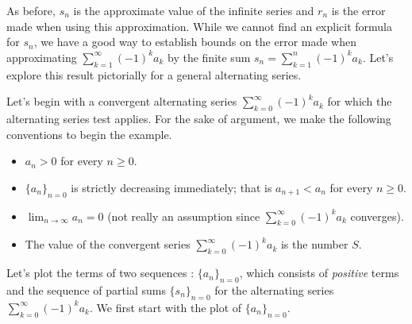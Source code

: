 \documentclass{ximera}
\begin{document}
As before, $s_n$ is the approximate value of the infinite series and $r_n$ is the error made when using this approximation.  While we cannot find an explicit formula for $s_n$, we have a good way to establish bounds on the error made when approximating $ \sum_{k=1}^{\infty} (-1)^k a_k$ by the finite sum $s_n= \sum_{k=1}^{n} (-1)^k a_k$.   Let's explore this result pictorially for a general alternating series.

\begin{model}
Let's begin with a convergent alternating series $\sum_{k=0}^{\infty} (-1)^k a_k$ for which the alternating series test applies.  For the sake of argument, we make the following conventions to begin the example.

\begin{itemize}
\item $a_n > 0$ for every $n \geq 0$. 
\item $\{a_n\}_{n=0}$ is strictly decreasing immediately; that is $a_{n+1} < a_n$ for every $n \geq 0$. 
\item $\lim_{n\to\infty} a_n= 0$ (not really an assumption since $\sum_{k=0}^{\infty} (-1)^k a_k$ converges).
\item The value of the convergent series $\sum_{k=0}^{\infty} (-1)^k a_k$ is the number $S$.
\end{itemize}

Let's plot the terms of two sequences : $\{a_n\}_{n=0}$, which consists of \emph{positive} terms and the  sequence of partial sums $\{s_n\}_{n=0}$ for the alternating series $\sum_{k=0}^{\infty} (-1)^k a_k$.  We first start with the plot of $\{a_n\}_{n=0}$.

\begin{image}
\end{image}
\end{model}
\end{document}
